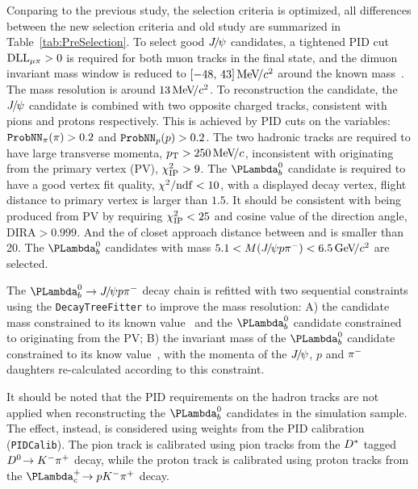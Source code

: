 %
Conparing to the previous study\supercite{LHCb-PAPER-2016-015},
the selection criteria is optimized,
all differences between the new selection criteria and old study are summarized in Table~\ref{tab:PreSelection}.
To select good ${{J\mskip -3mu/\mskip -2mu\psi}}$ candidates,
a tightened PID cut $\mathrm{DLL}_{{\mu}\pi}>0$ is required for both muon tracks in the final state,
and the dimuon invariant mass window is reduced to $[-48,\,43]\text{\,Me\kern -0.1em V\!/}c^2$ around the known \jpsi mass~\supercite{PDG2020}.
The \jpsi mass resolution is around $13\text{\,Me\kern -0.1em V\!/}c^2$.
To reconstruction the \Lb candidate, 
the ${{J\mskip -3mu/\mskip -2mu\psi}}$ candidate is combined with two opposite charged tracks, 
consistent with pions and protons respectively.
This is achieved by PID cuts on the \ProbNN variables: $\mbox{\texttt{ProbNN}}_{\pi}(\pi)>0.2$ and $\mbox{\texttt{ProbNN}}_{p}(p)>0.2$.
The two hadronic tracks are required to have large transverse momenta, $p_{\mathrm{T}}>250\text{\,Me\kern -0.1em V\!/}c$,
inconsistent with originating from the primary vertex (PV), $\chi^2_{\text{IP}}>9$.
The $\Lb$ candidate is required to have a good vertex fit quality, $\chi^2/\mathrm{ndf}<10$, 
with a displayed decay vertex,
flight distance to primary vertex is larger than $1.5$\mm.
It should be consistent with being produced from PV by requiring $\chi^2_{\text{IP}}<25$ and cosine value of the direction angle, DIRA$>0.999$.
And the \chisq of closet approach distance between \proton and \pim is smaller than 20.
The $\Lb$ candidates with mass $5.1<M({{J\mskip -3mu/\mskip -2mu\psi}} p\pi^-)<6.5 \text{\,Ge\kern -0.1em V\!/}c^2$ are selected.

The $\LbJpsiPPi$ decay chain is refitted with two sequential constraints using the \texttt{DecayTreeFitter} to improve the mass resolution:
A) the \jpsi candidate mass constrained to its known value~\supercite{PDG2020} and
the $\Lb$ candidate constrained to originating from the PV;
B) the invariant mass of the $\Lb$ candidate constrained to its know value~\supercite{PDG},
with the momenta of the ${{J\mskip -3mu/\mskip -2mu\psi}}$, $p$ and ${{\pi}^-}$ daughters re-calculated according to this constraint.

It should be noted that the PID requirements on the hadron tracks are not applied when reconstructing the $\Lb$ candidates in the simulation sample.
The effect, instead, is considered using weights from the PID calibration (\texttt{PIDCalib}).
The pion track is calibrated using pion tracks from the ${{D}^*}$ tagged ${{D}^0}\!\rightarrow {\ensuremath{{K}^-}}{\ensuremath{{\pi}^+}}$ decay, 
while the proton track is calibrated using proton tracks from the $\decay{\Lc}{p\Km\pip}$ decay.

